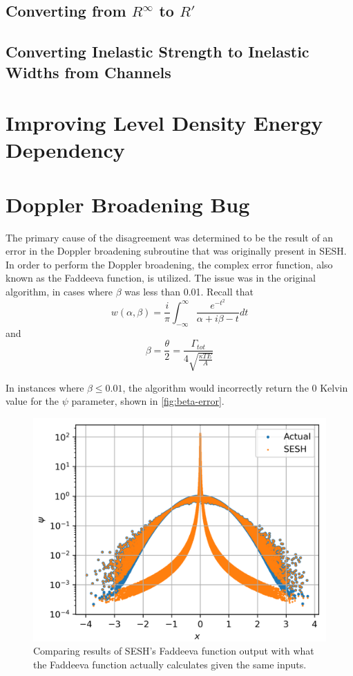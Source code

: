     \subsection{Converting from $R^\infty$ to $R'$}

    \subsection{Converting Inelastic Strength to Inelastic Widths from Channels}

\section{Improving Level Density Energy Dependency}

\section{Doppler Broadening Bug}
    The primary cause of the disagreement was determined to be the result of an error in the Doppler broadening subroutine that was originally present in SESH. In order to perform the Doppler broadening, the complex error function, also known as the Faddeeva function, is utilized. The issue was in the original algorithm, in cases where $\beta$ was less than 0.01. Recall that
    \begin{equation}
        w(\alpha,\beta) = \frac{i}{\pi} \int_{-\infty}^{\infty} \frac{e^{-t^2}}{\alpha + i\beta - t}dt
    \end{equation}
    and
    \begin{equation}
        \beta = \frac{\theta}{2} = \frac{\Gamma_{tot}}{4\sqrt{\frac{ \kappa T E}{A}}}
        \label{eq:doppler-beta}
    \end{equation}

    In instances where $\beta \leq 0.01$, the algorithm would incorrectly return the 0 Kelvin value for the $\psi$ parameter, shown in \autoref{fig:beta-error}.
    \begin{figure}
        \centering
        \includegraphics[width=0.95\linewidth]{Implementation/Figures/beta-error.png}
        \caption{Comparing results of SESH's Faddeeva function output with what the Faddeeva function actually calculates given the same inputs.}
        \label{fig:beta-error}
    \end{figure}
    
